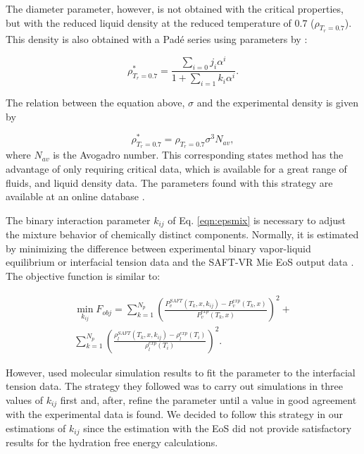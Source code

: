 The diameter parameter, however, is not obtained with the critical properties, but with the reduced liquid density at the reduced temperature of $0.7$ ($\rho_{T_{r}=0.7}$). This density is also obtained with a Padé series using parameters by :

\begin{equation}
\rho_{T_{r}=0.7}^{*} = \frac{\sum_{i=0} j_{i}\alpha^{i}}{1+\sum_{i=1} k_{i}\alpha^{i}} .
\label{eqn:denscorre}
\end{equation}

The relation between the equation above, $\sigma$ and the experimental density is given by

\begin{equation}
\rho_{T_{r}=0.7}^{*} = \rho_{T_{r}=0.7}\sigma^{3}N_{av},   
\label{eqn:sigmacorre}
\end{equation}
where $N_{av}$ is the Avogadro number. This corresponding states method has the advantage of only requiring critical data, which is available for a great range of fluids, and liquid density data. The parameters found with this strategy are available at an online database \cite{ervik2016}.     

The binary interaction parameter $k_{ij}$ of Eq. \eqref{eqn:epsmix} is necessary to adjust the mixture behavior of chemically distinct components. Normally, it is estimated by minimizing the difference between experimental binary vapor-liquid equilibrium or interfacial tension data and the SAFT-VR Mie EoS output data \cite{muller2017,lobanova2016}. The objective function is similar to: 

\begin{equation}
\begin{aligned}
\min\limits_{k_{ij}} F_{obj}= \sum_{k=1}^{N_{p}} \left(\frac{P_{v}^{SAFT}(T_{k},x,k_{ij})-P_{v}^{exp}(T_{k},x)}{P_{v}^{exp}(T_{k},x)} \right)^2 +\\
\sum_{k=1}^{N_{p}} \left(\frac{\rho_{l}^{SAFT}(T_{k},x,k_{ij})-\rho_{l}^{exp}(T_{i})}{\rho_{l}^{exp}(T_{i})} \right)^2 .
\end{aligned}
\label{eqn:fobjmix}
\end{equation}

However,  used molecular simulation results to fit the parameter to the interfacial tension data. The strategy they followed was to carry out simulations in three values of $k_{ij}$ first and, after, refine the parameter until a value in good agreement with the experimental data is found. We decided to follow this strategy in our estimations of $k_{ij}$ since the estimation with the EoS did not provide satisfactory results for the hydration free energy calculations.  

